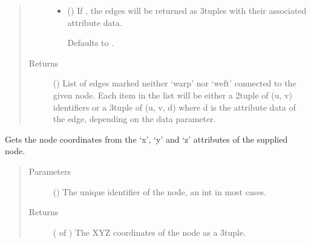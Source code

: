 \documentclass[letterpaper,10pt,english]{sphinxmanual}
\begin{document}
\begin{fulllineitems}
\begin{fulllineitems}
\begin{quote}
\begin{description}
\begin{itemize}
\item {} 
 (\sphinxstyleliteralemphasis{\sphinxupquote{, }}) \textendash{} 
If , the edges will be returned as 3\sphinxhyphen{}tuples with their
associated attribute data.

Defaults to .


\end{itemize}

\item[{Returns}] \leavevmode
{} () \textendash{} List of edges marked neither ‘warp’ nor ‘weft’ connected to the
given node. Each item in the list will be either a 2\sphinxhyphen{}tuple of
(u, v) identifiers or a 3\sphinxhyphen{}tuple of (u, v, d) where d is the
attribute data of the edge, depending on the data parameter.

\end{description}\end{quote}

\end{fulllineitems}


\begin{fulllineitems}
\label{\detokenize{cockatoo:cockatoo.KnitNetworkBase.node_coordinates}}
Gets the node coordinates from the ‘x’, ‘y’ and ‘z’ attributes of the
supplied node.
\begin{quote}\begin{description}
\item[{Parameters}] \leavevmode
{} () \textendash{} The unique identifier of the node, an int in most cases.

\item[{Returns}] \leavevmode
{} ( of ) \textendash{} The XYZ coordinates of the node as a 3\sphinxhyphen{}tuple.


\end{description}
\end{quote}
\end{fulllineitems}
\end{fulllineitems}
\end{document}
